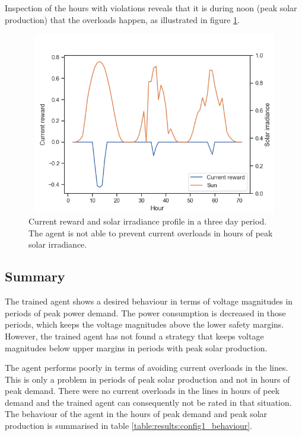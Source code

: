 \documentclass[class=book, crop=false]{standalone}
\begin{document}
Inspection of the hours with violations reveals that it is during noon (peak solar production) that the overloads happen, as illustrated in figure \ref{fig:results:config1_bad_current}.


\begin{figure}[H]
    \center
\includegraphics[height=8cm, width=12cm]{figures/config1_bad_current.png}
    \caption[size = 9]{Current reward and solar irradiance profile in a three day period. The agent is not able to prevent current overloads in hours of peak solar irradiance.}
    \label{fig:results:config1_bad_current}
\end{figure}


\subsection{Summary}
The trained agent shows a desired behaviour in terms of voltage magnitudes in periods of peak power demand. The power consumption is decreased in those periods, which keeps the voltage magnitudes above the lower safety margins. However, the trained agent has not found a strategy that keeps voltage magnitudes below upper margins in periods with peak solar production.

The agent performs poorly in terms of avoiding current overloads in the lines. This is only a problem in periods of peak solar production and not in hours of peak demand. There were no current overloads in the lines in hours of peek demand and the trained agent can consequently not be rated in that situation. The behaviour of the agent in the hours of peak demand and peak solar production is summarised in table \ref{table:results:config1_behaviour}.
\end{document}
